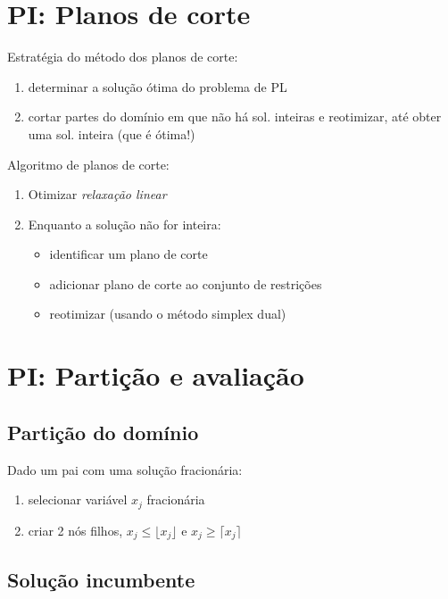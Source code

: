 \documentclass[10pt, a4paper]{article}
\begin{document}
\begin{multicols}{2}
\section{PI: Planos de corte}

Estratégia do método dos planos de corte:
\begin{enumerate}
    \item determinar a solução ótima do problema de PL
    \item cortar partes do domínio em que não há sol. inteiras e reotimizar, até obter uma sol. inteira (que é ótima!)
\end{enumerate}

Algoritmo de planos de corte:
\begin{enumerate}
    \item Otimizar \textit{relaxação linear}
    \item Enquanto a solução não for inteira:
    \begin{itemize}
        \item identificar um plano de corte
        \item adicionar plano de corte ao conjunto de restrições
        \item reotimizar (usando o método simplex dual)
    \end{itemize}
\end{enumerate}



\section{PI: Partição e avaliação}

\subsection{Partição do domínio}

Dado um pai com uma solução fracionária:
\begin{enumerate}
    \item selecionar variável \(x_j\) fracionária
    \item criar 2 nós filhos, \(x_j \le \lfloor x_j \rfloor\) e \(x_j \ge \lceil x_j \rceil \)
\end{enumerate}

\subsection{Solução incumbente}


\end{multicols}
\end{document}
